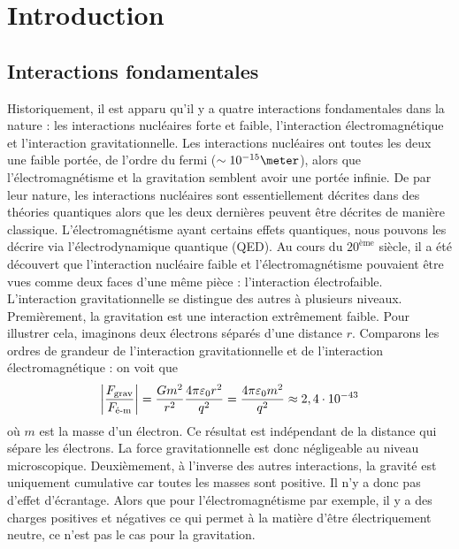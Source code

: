 \chapter{Introduction}

    \section{Interactions fondamentales}
    
        Historiquement, il est apparu qu'il y a quatre interactions fondamentales dans la nature : les interactions nucléaires forte et faible, l'interaction électromagnétique et l'interaction gravitationnelle. Les interactions nucléaires ont toutes les deux une faible portée, de l'ordre du fermi ($\sim10^{-15}\meter$), alors que  l'électromagnétisme et la gravitation semblent avoir une portée infinie. De par leur nature, les interactions nucléaires sont essentiellement décrites dans des théories quantiques alors que les deux dernières peuvent être décrites de manière classique. L'électromagnétisme ayant certains effets quantiques, nous pouvons les décrire via l'électrodynamique quantique (QED). Au cours du $20^{\text{ème}}$ siècle, il a été découvert que l'interaction nucléaire faible et l'électromagnétisme pouvaient être vues comme deux faces d'une même pièce : l'interaction électrofaible.\\
        
        L'interaction gravitationnelle se distingue des autres à plusieurs niveaux. Premièrement, la gravitation est une interaction extrêmement faible. Pour illustrer cela, imaginons deux électrons séparés d'une distance $r$. Comparons les ordres de grandeur de l'interaction gravitationnelle et de l'interaction électromagnétique : on voit que
        \begin{equation}
            \abs{\frac{F_{\text{grav}}}{F_{\text{é-m}}}} = \frac{Gm^2}{r^2}\frac{4\pi\varepsilon_0r^2}{q^2} = \frac{4\pi\varepsilon_0 m^2}{q^2} \approx 2,4\cdot10^{-43}
        \end{equation}
        où $m$ est la masse d'un électron. Ce résultat est indépendant de la distance qui sépare les électrons. La force gravitationnelle est donc négligeable au niveau microscopique. Deuxièmement, à l'inverse des autres interactions, la gravité est uniquement cumulative car toutes les masses sont positive. Il n'y a donc pas d'effet d'écrantage. Alors que pour l'électromagnétisme par exemple, il y a des charges positives et négatives ce qui permet à la matière d'être électriquement neutre, ce n'est pas le cas pour la gravitation.\\
        
